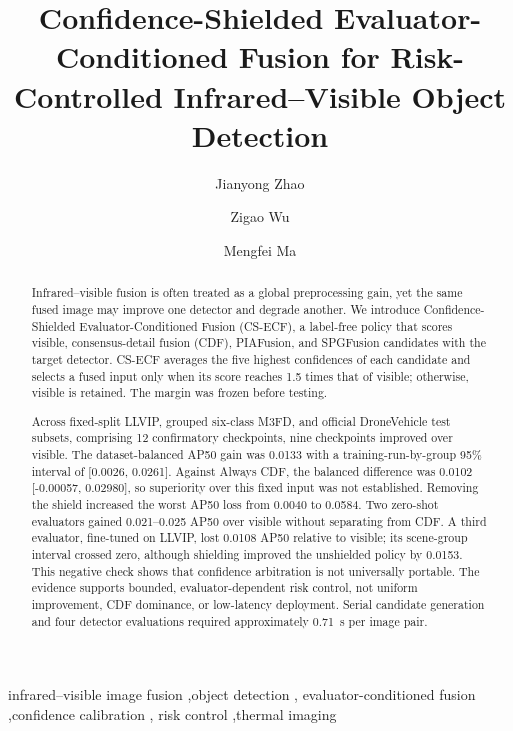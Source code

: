 \documentclass[preprint,11pt]{elsarticle}
\begin{document}
\sloppy

\begin{frontmatter}

\title{Confidence-Shielded Evaluator-Conditioned Fusion for Risk-Controlled Infrared--Visible Object Detection}

\author[AUTHOR]{Jianyong Zhao}

\author[AUTHOR]{Zigao Wu}

\author[AUTHOR]{Mengfei Ma}


\begin{abstract}
Infrared--visible fusion is often treated as a global preprocessing gain, yet
the same fused image may improve one detector and degrade another. We introduce
Confidence-Shielded Evaluator-Conditioned Fusion (CS-ECF), a label-free policy
that scores visible, consensus-detail fusion (CDF), PIAFusion, and SPGFusion
candidates with the target detector. CS-ECF averages the five highest
confidences of each candidate and selects a fused input only when its score
reaches 1.5 times that of visible; otherwise, visible is retained. The margin
was frozen before testing.

Across fixed-split LLVIP, grouped six-class M3FD, and official DroneVehicle test
subsets, comprising 12 confirmatory checkpoints, nine checkpoints improved over
visible. The dataset-balanced AP50 gain was 0.0133 with a
training-run-by-group 95\% interval of [0.0026, 0.0261]. Against Always CDF, the
balanced difference was 0.0102 [-0.00057, 0.02980], so superiority over this
fixed input was not established. Removing the shield increased the worst AP50
loss from 0.0040 to 0.0584. Two zero-shot evaluators gained 0.021--0.025 AP50
over visible without separating from CDF. A third evaluator, fine-tuned on
LLVIP, lost 0.0108 AP50 relative to visible; its scene-group interval crossed
zero, although shielding improved the unshielded policy by 0.0153. This negative
check shows that confidence arbitration is not universally portable. The
evidence supports bounded, evaluator-dependent risk control, not uniform
improvement, CDF dominance, or low-latency deployment. Serial candidate
generation and four detector evaluations required approximately
\SI{0.71}{s} per image pair.
\end{abstract}

\begin{keyword}
infrared--visible image fusion \sep object detection \sep
evaluator-conditioned fusion \sep confidence calibration \sep
risk control \sep thermal imaging
\end{keyword}

\end{frontmatter}
\end{document}
